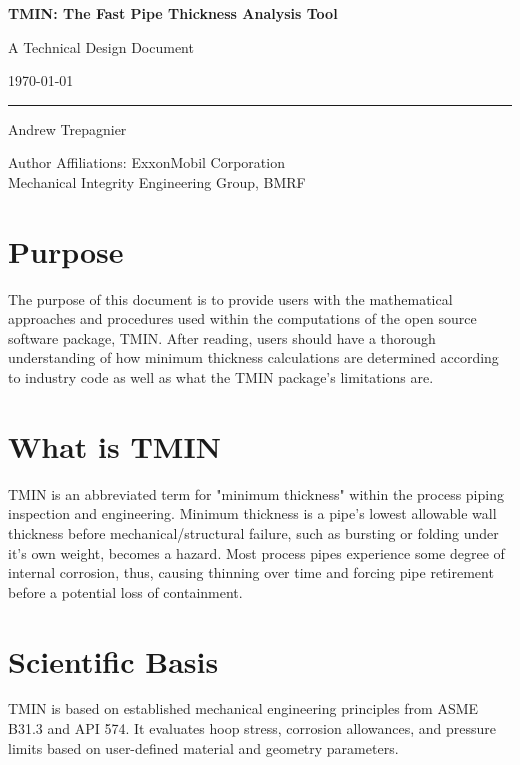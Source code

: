 \documentclass[11pt]{article}
\newcommand{\doctitle}{TMIN: The Fast Pipe Thickness Analysis Tool}
\newcommand{\docsubtitle}{A Technical Design Document}
\newcommand{\authorname}{Andrew Trepagnier}
\newcommand{\organization}{Author Affiliations: ExxonMobil Corporation \\ Mechanical Integrity Engineering Group, BMRF}
\begin{document}
\begin{titlepage}
    \centering
    \vspace*{4cm}
    {\Huge \bfseries \doctitle \par}
    \vspace{0.5cm}
    {\Large \docsubtitle \par}
    \vfill
    {\large \today \par}
    \vspace{14cm}
    \rule{\linewidth}{0.5pt}
    \vspace{0.3cm}
    {\small \authorname \par}
    {\small \organization \par}
\end{titlepage}

\tableofcontents
\newpage

\section{Purpose}
The purpose of this document is to provide users with the mathematical approaches and procedures used within the computations of the open source software package, TMIN. After reading, users should have a thorough understanding of how minimum thickness calculations are determined according to industry code as well as what the TMIN package's limitations are.


\section{What is TMIN}

TMIN is an abbreviated term for "minimum thickness" within the process piping inspection and engineering. Minimum thickness is a pipe's lowest allowable wall thickness before mechanical/structural failure, such as bursting or folding under it's own weight, becomes a hazard. Most process pipes experience some degree of internal corrosion, thus, causing thinning over time and forcing pipe retirement before a potential loss of containment.

\section{Scientific Basis}
TMIN is based on established mechanical engineering principles from ASME B31.3 and API 574. It evaluates hoop stress, corrosion allowances, and pressure limits based on user-defined material and geometry parameters.
\end{document}
